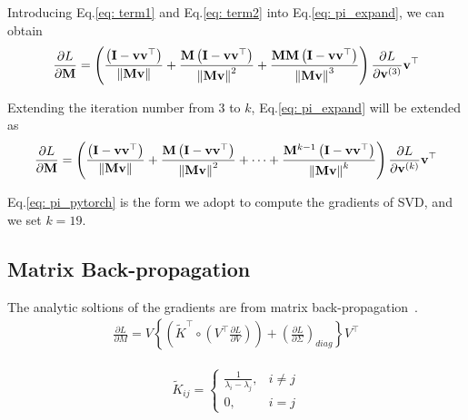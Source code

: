 Introducing Eq.\ref{eq: term1} and Eq.\ref{eq: term2} into Eq.\ref{eq: pi_expand}, we can obtain	
	\begin{equation}
	\frac{\partial L}{\partial \mathbf{M}}
	 = \left( \frac{\left(\mathbf{I}-\mathbf{v} \mathbf{v}^{\top}\right)}{\left\|\mathbf{M} \mathbf{v}\right\|} +
	 \frac{\mathbf{M} \left(\mathbf{I}-\mathbf{v} \mathbf{v}^{\top}\right)}{\left\|\mathbf{M} \mathbf{v}\right\|^{2}}  + 
	 \frac{\mathbf{M} \mathbf{M} \left(\mathbf{I}-\mathbf{v} \mathbf{v}^{\top}\right)}{\left\|\mathbf{M} \mathbf{v}\right\|^{3}} \right)
	 \frac{\partial L}{\partial \mathbf{v}^{(3)}} \mathbf{v}^{\top}
	\label{eq: pi_3iter}
	\end{equation}

Extending the iteration number from 3 to $k$, Eq.\ref{eq: pi_expand} will be extended as
	\begin{equation}
	\frac{\partial L}{\partial \mathbf{M}}
	 = \left( \frac{\left(\mathbf{I}-\mathbf{v} \mathbf{v}^{\top}\right)}{\left\|\mathbf{M} \mathbf{v}\right\|}  +
	 \frac{\mathbf{M} \left(\mathbf{I}-\mathbf{v} \mathbf{v}^{\top}\right)}{\left\|\mathbf{M} \mathbf{v}\right\|^{2}}  + \cdots +
	 \frac{\mathbf{M}^{k-1} \left(\mathbf{I}-\mathbf{v} \mathbf{v}^{\top}\right)}{\left\|\mathbf{M} \mathbf{v}\right\|^{k}} \right) \frac{\partial L}{\partial \mathbf{v}^{(k)}}
	\mathbf{v}^{\top}
	\label{eq: pi_pytorch}
	\end{equation}	

Eq.\ref{eq: pi_pytorch} is the form we adopt to compute the gradients of SVD, and we set $k{=}19$.
	
	\subsection{Matrix Back-propagation}
	\label{sec: mbp}
	The analytic soltions of the gradients are from matrix back-propagation~\cite{ionescu2015matrix}.
	\begin{equation}
	\begin{aligned}
	\frac{\partial L}{\partial M}=V\left\{\left(\tilde{K}^{\top} \circ\left(V^{\top} \frac{\partial L}{\partial V}\right)\right)+\left(\frac{\partial L}{\partial \Sigma}\right)_{d i a g}\right\} V^{\top}
	\end{aligned}
	\end{equation}
	
	\begin{equation}
	\begin{aligned}
	\tilde{K}_{i j}=\left\{\begin{array}{ll}{\frac{1}{\lambda_{i}-\lambda_{j}},} & {i \neq j} \\ {0,} & {i=j}\end{array}\right.
	\end{aligned}
	\end{equation}
	

